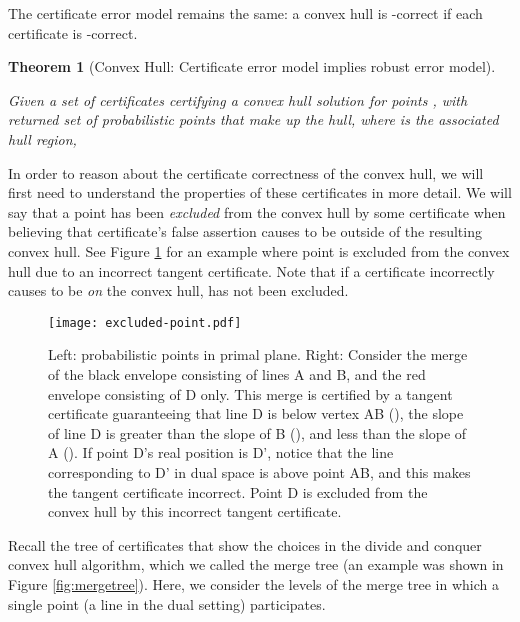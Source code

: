 \documentclass[11pt]{article}
\newtheorem{theorem}{\textbf{Theorem}}[section]
\begin{document}
The certificate error model remains the same: a convex hull is -correct 
if each certificate is -correct.

\newcommand{\thmConvexHull}{
Given a set of certificates  certifying a convex hull solution for points , with returned set of probabilistic points  that make up the hull, where  is the associated hull region, 


}

\begin{theorem}[Convex Hull: Certificate error model implies robust error model]
\label{thm:convex_hull}
\thmConvexHull
\end{theorem}

In order to reason about the certificate correctness of the convex
hull, we will first need to understand the properties of these
certificates in more
detail.  
We will say that a point  has been \emph{excluded} from the convex
hull by some certificate when believing that certificate's false
assertion causes  to be outside of the resulting convex hull.  See
Figure \ref{fig:excluded point} for an example where point  is
excluded from the convex hull due to an incorrect tangent
certificate. Note that if a certificate incorrectly causes  to be
\emph{on} the convex hull,  has not been excluded.

\begin{figure}[h]  
\begin{center}
\texttt{[image: excluded-point.pdf]}
\end{center}
\caption{Left: probabilistic points in primal plane. Right: Consider the merge of the black envelope consisting of lines A and B, and the red envelope consisting of D only. This merge is certified by a tangent certificate guaranteeing that line D is below vertex AB (), the slope of line D is greater than the slope of B (), and less than the slope of A (). If point D's real position is D', notice that the line corresponding to D' in dual space is above point AB, and this makes the tangent certificate incorrect. Point D is excluded from the convex hull by this incorrect tangent certificate.}

\label{fig:excluded point}
\end{figure}
Recall the tree of certificates that show the choices in the divide and conquer convex hull algorithm, which we called the merge tree (an example was shown in Figure \ref{fig:mergetree}).  
Here, we consider the levels of the merge tree in which a single point (a line in the dual setting) participates.
\end{document}
